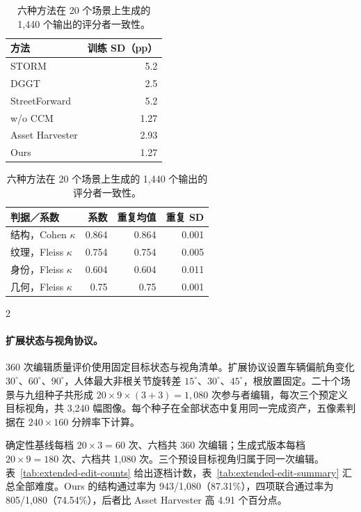 \begin{table}[H]
\begin{minipage}[t]{0.48\textwidth}
\centering\small
\setlength{\tabcolsep}{4pt}
\caption{基本协议联合通过率的训练 SD，单位为百分点。}
\label{tab:edit-training-sd}
\begin{tabular}{@{}lr@{}}
\toprule
方法 & 训练 SD（pp） \\
\midrule
STORM & 5.2 \\
DGGT & 2.5 \\
StreetForward & 5.2 \\
w/o CCM & 1.27 \\
Asset Harvester & 2.93 \\
Ours & 1.27 \\
\bottomrule
\end{tabular}
\end{minipage}\hfill
\begin{minipage}[t]{0.48\textwidth}
\centering\small
\setlength{\tabcolsep}{4pt}
\caption{六种方法在 20 个场景上生成的 1,440 个输出的评分者一致性。}
\label{tab:rater-agreement}
\begin{tabular}{@{}lrrr@{}}
\toprule
判据／系数 & 系数 & 重复均值 & 重复 SD \\
\midrule
结构，Cohen $\kappa$ & 0.864 & 0.864 & 0.001 \\
纹理，Fleiss $\kappa$ & 0.754 & 0.754 & 0.005 \\
身份，Fleiss $\kappa$ & 0.604 & 0.604 & 0.011 \\
几何，Fleiss $\kappa$ & 0.75 & 0.75 & 0.001 \\
\bottomrule
\end{tabular}
\end{minipage}
\end{table}
\begin{multicols}{2}

\paragraph{扩展状态与视角协议。}
360 次编辑质量评价使用固定目标状态与视角清单。扩展协议设置车辆偏航角变化 $30^\circ$、$60^\circ$、$90^\circ$，人体最大非根关节旋转差 $15^\circ$、$30^\circ$、$45^\circ$，根放置固定。二十个场景与九组种子共形成 $20\times9\times(3+3)=1,080$ 次参与者编辑，每次三个预定义目标视角，共 3,240 幅图像。每个种子在全部状态中复用同一完成资产，五像素判据在 $240\times160$ 分辨率下计算。

确定性基线每档 $20\times3=60$ 次、六档共 360 次编辑；生成式版本每档 $20\times9=180$ 次、六档共 1,080 次。三个预设目标视角归属于同一次编辑。表~\ref{tab:extended-edit-counts} 给出逐档计数，表~\ref{tab:extended-edit-summary} 汇总全部难度。Ours 的结构通过率为 943/1,080（87.31\%），四项联合通过率为 805/1,080（74.54\%），后者比 Asset Harvester 高 4.91 个百分点。

\end{multicols}
